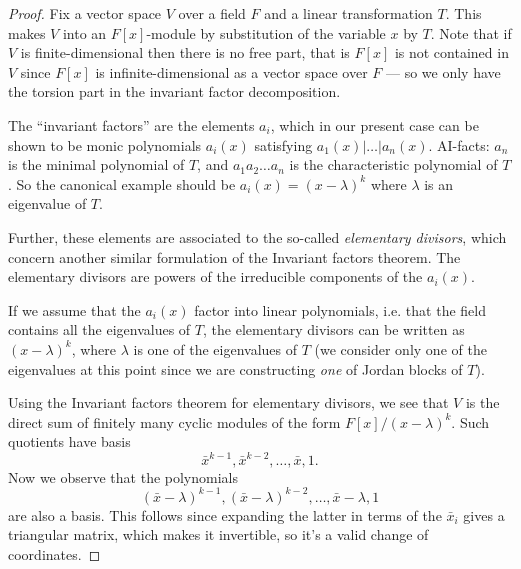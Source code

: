 \begin{proof}
Fix a vector space $V$ over a field $F$
and a linear transformation $T$. This makes
$V$ into an $F[x]$-module by substitution of
the variable $x$ by $T$.
Note that if $V$ is finite-dimensional
then there is no free part,
that is $F[x]$ is not contained
in $V$ since $F[x]$ is
infinite-dimensional as a vector space
over $F$ --- so we only have the
torsion part in the invariant factor
decomposition.

The ``invariant factors'' are the elements
$a_i$, which in our
present case can be shown to be monic
polynomials $a_i(x)$ satisfying
$a_1(x)|\ldots|a_n(x)$. 
AI-facts: $a_n$ is the minimal polynomial
of $T$, and $a_1a_2… a_n$ is the
characteristic polynomial of $T$.
So the canonical example should be
$a_i(x)=(x-\lambda)^k$
where $\lambda$ is an eigenvalue of $T$.

Further, these
elements are associated to the so-called
{\it elementary divisors}, which concern
another similar formulation of the Invariant
factors theorem. The elementary divisors are
powers of the irreducible components of the
$a_i(x)$.

If we assume that the $a_i(x)$ factor into
linear polynomials, 
i.e. that the field contains all the
eigenvalues of $T$,
the elementary divisors
can be written as $(x-\lambda)^k$, where
$\lambda$ is one of the eigenvalues of $T$
(we consider only one of the eigenvalues at
this point since we are constructing
{\it one} of Jordan blocks of $T$).

Using the Invariant factors theorem for
elementary divisors, we see that $V$ is the
direct sum of finitely many cyclic modules of
the form $F[x]/(x-\lambda)^k$. Such quotients
have basis
$$
\bar{x}^{k-1},\bar{x}^{k-2},\ldots,
\bar{x},1.
$$
Now we observe that the polynomials
$$
(\bar{x}-\lambda)^{k-1},
(\bar{x}-\lambda)^{k-2},\ldots,
\bar{x}-\lambda,1
$$
are also a basis. This follows since
expanding the latter in terms of the
$\bar{x}_i$ gives a triangular matrix, which
makes it invertible, so it's a valid change
of coordinates.


\end{proof}
